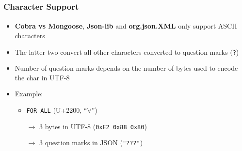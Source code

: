 \documentclass[
    alternativetitlepage=alternativ,
    cornerlogo=hgi_nds_logo2,
    sectionoverview,
]{rubpresentation}
\begin{document}
\begin{frame}
  \frametitle{Character Support}
  \framesubtitle{}
  \begin{itemize}
    \item{} \textbf{Cobra vs Mongoose}, \textbf{Json-lib} and \textbf{org.json.XML} only support ASCII characters
    \item{} The latter two convert all other characters converted to question marks (\texttt{?})
    \item{} Number of question marks depends on the number of bytes used to encode the char in UTF-8
    \item{} Example:
      \begin{itemize}
          \item{} \texttt{FOR ALL} (U+2200, \enquote{$\forall$})
          \item[$\rightarrow$] 3 bytes in UTF-8 (\texttt{0xE2 0x88 0x80})
          \item[$\rightarrow$] 3 question marks in JSON (\texttt{"???"})
      \end{itemize}
  \end{itemize}
\end{frame}
\end{document}
